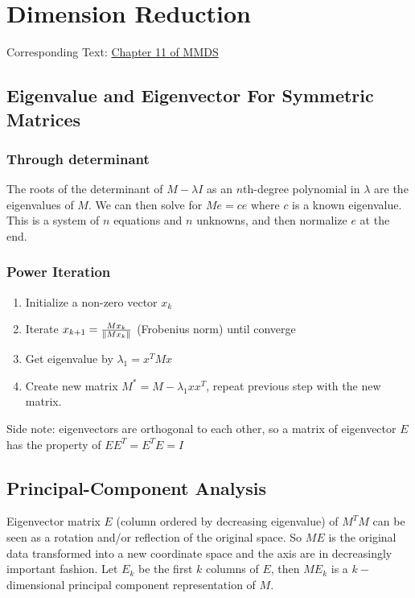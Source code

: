 \chapter{Dimension Reduction} 
Corresponding Text: \href{http://infolab.stanford.edu/~ullman/mmds/ch11.pdf}{Chapter 11 of MMDS}

\section{Eigenvalue and Eigenvector For Symmetric Matrices} 

\subsection{Through determinant} 
The roots of the determinant of $M - \lambda I$ as an $n$th-degree polynomial in $\lambda$ are the eigenvalues of $M$. We can then solve for $Me = c e$ where $c$ is a known eigenvalue. This is a system of $n$ equations and $n$ unknowns, and then normalize $e$ at the end. 

\subsection{Power Iteration} 
\begin{enumerate}
    \item Initialize a non-zero vector $x_k$
    \item Iterate $x_{k+1} = \frac{M x_k}{\left\lVert M x_k\right\rVert}$ (Frobenius norm) until converge
    \item Get eigenvalue by  $\lambda_1 = x^T M x$
    \item Create new matrix $M^* = M - \lambda_1 xx^T$, repeat previous step with the new matrix.
\end{enumerate}
Side note: eigenvectors are orthogonal to each other, so a matrix of eigenvector $E$ has the property of $EE^T = E^TE=I$



\section{Principal-Component Analysis} 
Eigenvector matrix $E$ (column ordered by decreasing eigenvalue) of $M^TM$ can be seen as a rotation and/or reflection of the original space. So $ME$ is the original data transformed into a new coordinate space and the axis are in decreasingly important fashion. Let $E_k$ be the first $k$ columns of $E$, then $ME_k$ is a $k-$ dimensional principal component representation of $M$. 



